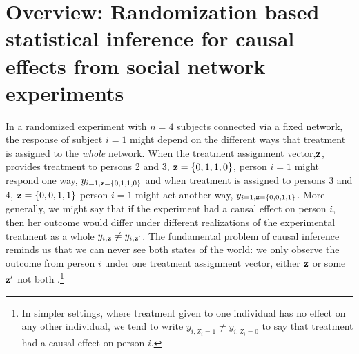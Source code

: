 

\section{Overview: Randomization based statistical inference for causal effects from social network experiments}

In a randomized experiment with $n=4$ subjects connected via a fixed network,
the response of subject $i=1$ might depend on the different ways that
treatment is assigned to the \emph{whole} network. When the treatment
assignment vector,$\mathbf{z}$, provides treatment to persons 2 and 3,
$\mathbf{z}=\{0,1,1,0\}$, person $i=1$ might respond one way,
$y_{i=1,\mathbf{z}=\{0,1,1,0\}}$ and when treatment is assigned to persons 3 and 4,
$\mathbf{z}=\{0,0,1,1\}$ person $i=1$ might act another way,
$y_{i=1,\mathbf{z}=\{0,0,1,1\}}$. More generally, we might say that if the experiment had a causal effect on
person $i$, then her outcome would differ under different realizations of the
experimental treatment as a whole $y_{i,\mathbf{z}} \ne y_{i,\mathbf{z}'}$. The fundamental problem of
causal inference reminds us that we can never see both states of the world: we
only observe the outcome from person $i$ under one treatment assignment
vector, either $\mathbf{z}$ or some $\mathbf{z}'$ not both
\citep{holland:1986a,brady2008cae}.\footnote{In simpler settings, where
  treatment given to one individual has no effect on any other individual, we tend to
  write $y_{i,Z_i=1} \ne y_{i,Z_i=0}$ to say that treatment had a causal
  effect on person $i$.}

